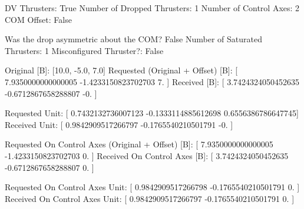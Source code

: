 DV Thrusters:	True
Number of Dropped Thrusters:	1
Number of Control Axes:	2
COM Offset:	False

Was the drop asymmetric about the COM?	False
Number of Saturated Thrusters:	1
Misconfigured Thruster?:	False

Original [B]:	[10.0, -5.0, 7.0]
Requested (Original + Offset) [B]:	[ 7.9350000000000005 -1.4233150823702703  7.                ]
Received [B]:		[ 3.7424324050452635 -0.6712867658288807 -0.                ]

Requested Unit:		[ 0.7432132736007123 -0.1333114885612698  0.6556386786647745]
Received Unit:		[ 0.9842909517266797 -0.1765540210501791 -0.                ]

Requested On Control Axes (Original + Offset) [B]:	[ 7.9350000000000005 -1.4233150823702703  0.                ]
Received On Control Axes [B]:		[ 3.7424324050452635 -0.6712867658288807  0.                ]

Requested On Control Axes Unit:		[ 0.9842909517266798 -0.1765540210501791  0.                ]
Received On Control Axes Unit:		[ 0.9842909517266797 -0.1765540210501791  0.                ]

